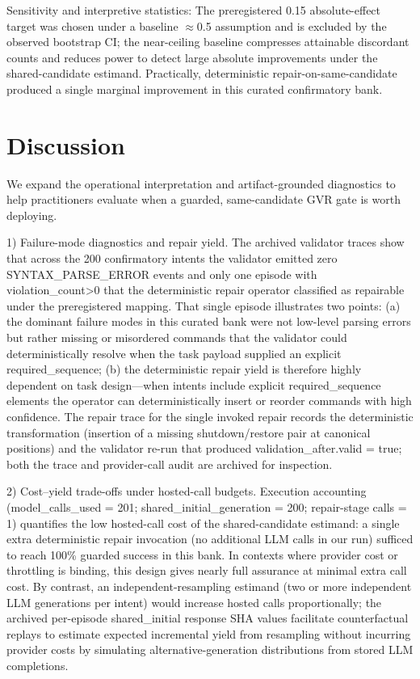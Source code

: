 \documentclass[conference]{IEEEtran}
\begin{document}
Sensitivity and interpretive statistics: The preregistered 0.15 absolute-effect target was chosen under a baseline \ensuremath{\approx}0.5 assumption and is excluded by the observed bootstrap CI; the near-ceiling baseline compresses attainable discordant counts and reduces power to detect large absolute improvements under the shared-candidate estimand. Practically, deterministic repair-on-same-candidate produced a single marginal improvement in this curated confirmatory bank.

\section{Discussion}
We expand the operational interpretation and artifact-grounded diagnostics to help practitioners evaluate when a guarded, same-candidate GVR gate is worth deploying.

1) Failure-mode diagnostics and repair yield. The archived validator traces show that across the 200 confirmatory intents the validator emitted zero SYNTAX\_PARSE\_ERROR events and only one episode with violation\_count>0 that the deterministic repair operator classified as repairable under the preregistered mapping. That single episode illustrates two points: (a) the dominant failure modes in this curated bank were not low-level parsing errors but rather missing or misordered commands that the validator could deterministically resolve when the task payload supplied an explicit required\_sequence; (b) the deterministic repair yield is therefore highly dependent on task design---when intents include explicit required\_sequence elements the operator can deterministically insert or reorder commands with high confidence. The repair trace for the single invoked repair records the deterministic transformation (insertion of a missing shutdown/restore pair at canonical positions) and the validator re-run that produced validation\_after.valid = true; both the trace and provider-call audit are archived for inspection.

2) Cost--yield trade-offs under hosted-call budgets. Execution accounting (model\_calls\_used = 201; shared\_initial\_generation = 200; repair-stage calls = 1) quantifies the low hosted-call cost of the shared-candidate estimand: a single extra deterministic repair invocation (no additional LLM calls in our run) sufficed to reach 100\% guarded success in this bank. In contexts where provider cost or throttling is binding, this design gives nearly full assurance at minimal extra call cost. By contrast, an independent-resampling estimand (two or more independent LLM generations per intent) would increase hosted calls proportionally; the archived per-episode shared\_initial response SHA values facilitate counterfactual replays to estimate expected incremental yield from resampling without incurring provider costs by simulating alternative-generation distributions from stored LLM completions.
\end{document}
